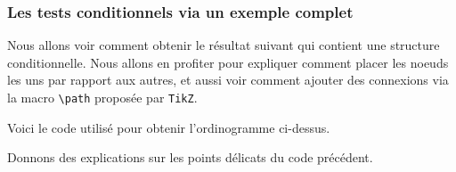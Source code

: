 \documentclass[12pt,a4paper]{article}
\begin{document}




\subsubsection{Les tests conditionnels via un exemple complet}

Nous allons voir comment obtenir le résultat suivant qui contient une structure conditionnelle. Nous allons en profiter pour expliquer comment placer les noeuds les uns par rapport aux autres, et aussi voir comment ajouter des connexions via la macro \verb+\path+ proposée par \verb+TikZ+.


\begin{center}
    \small
    
\end{center}


Voici le code utilisé pour obtenir l'ordinogramme ci-dessus.

\medskip



Donnons des explications sur les points délicats du code précédent.
\end{document}
